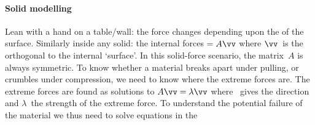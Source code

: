 \begin{comment}
Dynamics of two masses on a spring (relate to molecular vibrations), and seek solutions in~\(\cos(ft)\) for eigenvalue \(\lambda=f^2\).  
As done for three masses in \cref{eg:eig3vib}---if not omitted.  
Say symmetry from equal and opposite, claim holds even for gigantic structures with millions of interacting components.
\end{comment}


\paragraph{Solid modelling} Lean with a hand on a table\slash wall: the force changes depending upon the  of the surface.  
Similarly inside any solid: the internal forces\({}=A\vv\) where \(\vv\)~is the orthogonal  to the internal `surface'.  
In this solid-force scenario, the matrix~\(A\) is always symmetric.  
To know whether a material breaks apart under pulling, or crumbles under compression, we need to know where the extreme forces are.  
The extreme forces are found as solutions to \(A\vv=\lambda\vv\) where \vv~gives the direction and \(\lambda\)~the strength of the extreme force.
To understand the potential failure of the material we thus need to solve equations in the 




\endinput

